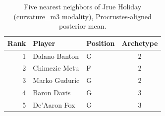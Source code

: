 \begin{table}[htbp]
  \centering\small
  \begin{tabular}{rllc}
    \toprule
    Rank & Player & Position & Archetype \\
    \midrule
    1 & Dalano Banton & G & 2 \\
    2 & Chimezie Metu & F & 2 \\
    3 & Marko Guduric & G & 2 \\
    4 & Baron Davis & G & 3 \\
    5 & De'Aaron Fox & G & 3 \\
    \bottomrule
  \end{tabular}
  \caption{Five nearest neighbors of Jrue Holiday (curvature_m3 modality), Procrustes-aligned posterior mean.}
  \label{tab:Jrue_Holiday_neighbors_curvature_m3}
\end{table}

